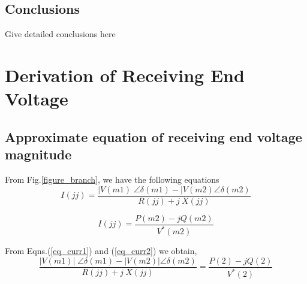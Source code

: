 \documentclass[a4paper,12pt,oneside]{report}%
\begin{document}
\section{Conclusions}

Give detailed conclusions here
\appendix
\chapter{Derivation of Receiving End Voltage}

\section*{Approximate equation of receiving end voltage magnitude}
From Fig.\ref{figure_branch}, we have the following equations
\begin{equation}
I(jj)=\frac{|V(m1)\;\angle\delta(m1)-|V(m2)\angle\delta(m2)}{R(jj)+j\:X(jj)}
 \label{eq_curr1}
 \end{equation}

\begin{equation}
I(jj)=\frac{P(m2)-jQ(m2)}{V^*(m2)}
 \label{eq_curr2}
 \end{equation}

From Eqns.(\ref{eq_curr1}) and (\ref{eq_curr2}) we obtain,
\begin{equation}
\frac{|V(m1)|\;\angle\delta(m1)-|V(m2)|\angle\delta(m2)}{R(jj)+j\:X(jj)}=\frac{P(2)-jQ(2)}{V^*(2)}
 \label{eq_equa}
 \end{equation}





\newpage
\end{document}
